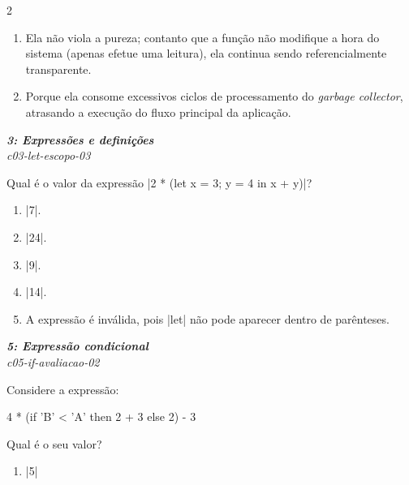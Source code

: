 \documentclass[a4paper,10pt,brazil]{article}
\begin{document}
\begin{multicols}{2}
\begin{enumerate}
  \item Ela não viola a pureza; contanto que a função não modifique a hora do sistema (apenas efetue uma leitura), ela continua sendo referencialmente transparente.

  \item Porque ela consome excessivos ciclos de processamento do \emph{garbage collector}, atrasando a execução do fluxo principal da aplicação.


\end{enumerate}

\begin{flushright}
  \footnotesize
  \textit{\textbf{3: Expressões e definições}}\\
  \textit{c03-let-escopo-03}\\

\end{flushright}
Qual é o valor da expressão \haskellinline|2 * (let x = 3; y = 4 in x + y)|?

\begin{enumerate}
  \item \haskellinline|7|.

  \item \haskellinline|24|.

  \item \haskellinline|9|.

  \item \haskellinline|14|.

  \item A expressão é inválida, pois \haskellinline|let| não pode aparecer dentro de parênteses.


\end{enumerate}

\begin{flushright}
  \footnotesize
  \textit{\textbf{5: Expressão condicional}}\\
  \textit{c05-if-avaliacao-02}\\

\end{flushright}
Considere a expressão:
\begin{haskellcode}
4 * (if 'B' < 'A' then 2 + 3 else 2) - 3
\end{haskellcode}
Qual é o seu valor?

\begin{enumerate}
  \item \haskellinline|5|


\end{enumerate}
\end{multicols}
\end{document}
